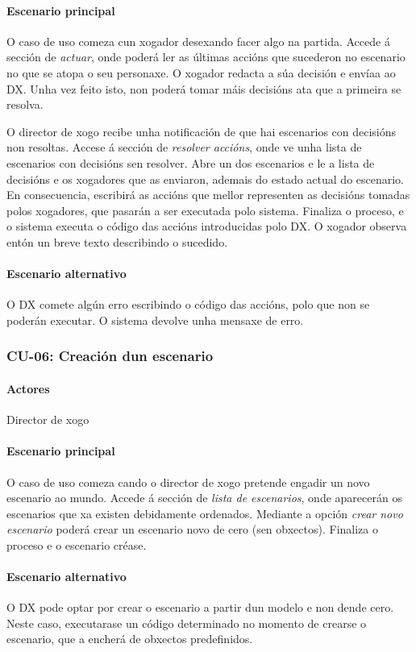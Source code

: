 \paragraph{Escenario principal}
O caso de uso comeza cun xogador desexando facer algo na partida. Accede á
sección de {\it actuar}, onde poderá ler as últimas accións que sucederon no
escenario no que se atopa o seu personaxe. O xogador redacta a súa decisión e
envíaa ao DX. Unha vez feito isto, non poderá tomar máis decisións ata que a
primeira se resolva.
\par
O director de xogo recibe unha notificación de que hai escenarios con decisións
non resoltas. Accese á sección de {\it resolver accións}, onde ve unha lista de
escenarios con decisións sen resolver. Abre un dos escenarios e le a lista de
decisións e os xogadores que as enviaron, ademais do estado actual do escenario.
En consecuencia, escribirá as accións que mellor representen as decisións
tomadas polos xogadores, que pasarán a ser executada polo sistema. Finaliza o
proceso, e o sistema executa o código das accións introducidas polo DX. O
xogador observa entón un breve texto describindo o sucedido.

\paragraph{Escenario alternativo}
O DX comete algún erro escribindo o código das accións, polo que non se poderán
executar. O sistema devolve unha mensaxe de erro.

\subsubsection{CU-06: Creación dun escenario}
\paragraph{Actores}
Director de xogo
\paragraph{Escenario principal}
O caso de uso comeza cando o director de xogo pretende engadir un novo
escenario ao mundo. Accede á sección de {\it lista de escenarios}, onde
aparecerán os escenarios que xa existen debidamente ordenados. Mediante a opción
{\it crear novo escenario} poderá crear un escenario novo de cero (sen
obxectos).
Finaliza o proceso e o escenario créase.

\paragraph{Escenario alternativo}
O DX pode optar por crear o escenario a partir dun modelo e non dende cero.
Neste caso, executarase un código determinado no momento de crearse o escenario,
que a encherá de obxectos predefinidos.

